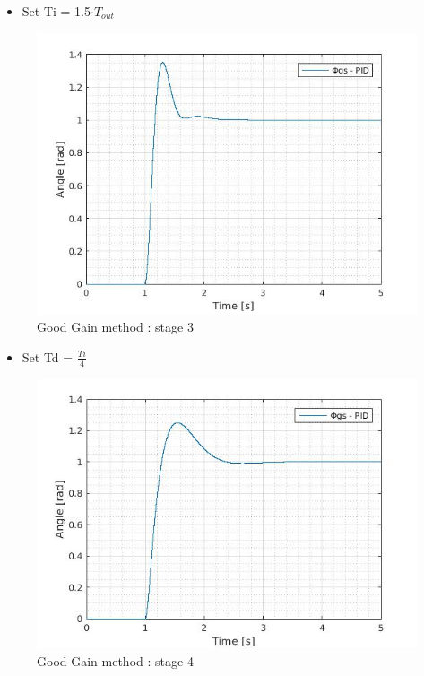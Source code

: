     
\begin{itemize}
  \item Set Ti = 1.5$\cdot T_{out}$
\end{itemize}
  
  \begin{figure}[H]
    \centering
    \includegraphics[scale=0.4]{figures/GG3.jpg}
    \caption[LABEL] {Good Gain method : stage 3} 
  \end{figure}
    
    
\begin{itemize}
  \item Set Td = $\frac{Ti}{4}$
\end{itemize}
  
  \begin{figure}[H]
    \centering
    \includegraphics[scale=0.4]{figures/GG4.jpg}
    \caption[LABEL] {Good Gain method : stage 4} 
  \end{figure}
    
